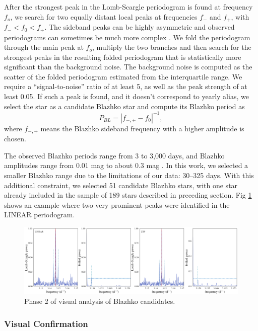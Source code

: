 After the strongest peak in the Lomb-Scargle periodogram is found at frequency $f_o$, we search for  two equally
distant local peaks at frequencies $f_-$ and $f_+$, with $f_- < f_0 < f_+$.  The sideband peaks can be highly asymmetric
\cite{2003ApJ...598..597A} and observed periodograms can sometimes be much more complex \cite{2007MNRAS.377.1263S}.  
We fold the periodogram through the main peak at $f_o$, multiply the two branches and then search for the strongest peaks
in the resulting folded periodogram that is statistically more significant than the background noise. The background noise
is computed as the scatter of the folded periodogram estimated from the interquartile range. We require a ``signal-to-noise''
ratio of at least 5, as well as the peak strength of at least 0.05. 
If such a peak is found,
and it doesn't correspond to yearly alias, we select the star as a candidate Blazhko star and compute
its Blazhko period as 
\begin{equation*}
P_{BL} = |f_{-,+} - f_0|^{-1},
\end{equation*}
where $f_{-,+}$ means the Blazhko sideband frequency with a higher amplitude is chosen. 

The observed Blazhko periods range from 3 to 3,000 days, and Blazhko amplitudes range from 0.01 mag to about 0.3 mag \citep{2007MNRAS.377.1263S}. In this work, we selected a smaller Blazhko range due to the limitations of our data: 30--325 days. 
With this additional constraint, we selected 51 candidate Blazhko stars, with one star already included in the sample
of 189 stars described in preceding section. 
Fig \ref{fig:phase2} shows an example where two very prominent peaks were identified in the LINEAR periodogram. 

\begin{figure}[ht]
  \centering       
  \includegraphics[width=17cm]{periodogram7048826.png}
    \caption{Phase 2 of visual analysis of Blazhko candidates.}
    \label{fig:phase2}
\end{figure}



\subsubsection{Visual Confirmation}

